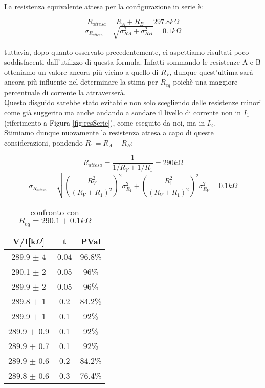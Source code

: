 \documentclass[a4paper]{article}
\theoremstyle{definition}
\begin{document}
\pagebreak

\noindent La resistenza equivalente attesa per la configurazione in serie è:

\[R_{attesa} = R_{A}+R_{B} = 297.8   k\Omega\]
\[ \sigma_{R_{attesa} } = \sqrt{\sigma^{2}_{RA} + \sigma^{2}_{RB}} = 0.1 k\Omega \]

\noindent tuttavia, dopo quanto osservato precedentemente, ci aspettiamo risultati poco soddisfacenti dall'utilizzo di questa formula. Infatti sommando le resistenze A e B  otteniamo un valore ancora più vicino a quello di \(R_{V}\), dunque quest'ultima sarà ancora più influente nel determinare la stima per \(R_{eq}\) poichè una maggiore percentuale di corrente la attraverserà.\\
Questo disguido sarebbe stato evitabile non solo scegliendo delle resistenze minori come già suggerito ma anche andando a sondare il livello di corrente non in \(I_{1}\) (riferimento a Figura \ref{fig:resSerie}), come eseguito da noi, ma in \(I_{2}\).\\

\noindent Stimiamo dunque nuovamente la resistenza attesa a capo di queste considerazioni, pondendo \(R_{1} = R_{A} + R_{B}\):

\[R_{attesa} = \frac{1}{1/R_{V} + 1/R_{1}} = 290 k\Omega\]
\[\sigma_{R_{attesa}} = \sqrt{\left(\frac{R_V^{2}}{(R_V + R_{1})^{2}}\right)^{2}\sigma^{2}_{R_{1}} + \left(\frac{R_{1}^{2}}{(R_V + R_{1})^{2}}\right)^{2}\sigma^{2}_{R_V}} = 0.1 k\Omega \]

\begin{table}[!htbp]
\centering
    \captionsetup{labelformat=empty}
        \caption{confronto con \(R_{eq} = 290.1 \pm 0.1k\Omega\)}
    \begin{tabular}{c|c|c}
        V/I[k$\Omega$] & t & PVal\\
        \hline
        \hline
        289.9 \(\pm\) 4  & 0.04 & 96.8\%\\
        290.1 \(\pm\) 2 & 0.05 &96\%\\
        289.9 \(\pm\) 2& 0.05 &96\%\\
        289.8 \(\pm\) 1& 0.2 & 84.2\%\\
        289.9 \(\pm\) 1 & 0.1 &92\%\\
        289.9 \(\pm\) 0.9 & 0.1 &92\%\\
        289.9 \(\pm\) 0.7 & 0.1 &92\%\\
        289.9 \(\pm\) 0.6 & 0.2 &84.2\%\\
        289.8 \(\pm\) 0.6 & 0.3 & 76.4\%\\
        
        \hline
        \hline
    \end{tabular}

\end{table}
\end{document}
